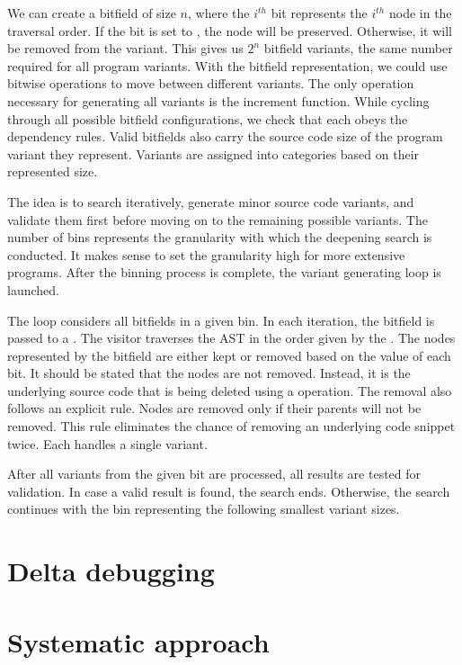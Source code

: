 We can create a bitfield of size $n$, where the $i^{th}$ bit represents 
the $i^{th}$ node in the traversal order.
If the bit is set to , the node will be preserved.
Otherwise, it will be removed from the variant.
This gives us $2^n$ bitfield variants, the same number required for all 
program variants.
With the bitfield representation, we could use bitwise operations to move 
between different variants.
The only operation necessary for generating all variants is the increment 
function.
While cycling through all possible bitfield configurations, we check that 
each obeys the dependency rules.
Valid bitfields also carry the source code size of the program variant they 
represent.
Variants are assigned into categories based on their represented size.

The idea is to search iteratively, generate minor source code variants, and 
validate them first before moving on to the remaining possible variants.
The number of bins represents the granularity with which the deepening 
search is conducted.
It makes sense to set the granularity high for more extensive programs.
After the binning process is complete, the variant generating loop is 
launched.

The loop considers all bitfields in a given bin.
In each iteration, the bitfield is passed to 
a .
The visitor traverses the AST in the order given by 
the .
The nodes represented by the bitfield are either kept or removed based on 
the value of each bit.
It should be stated that the nodes are not removed.
Instead, it is the underlying source code that is being deleted using 
a  operation.
The removal also follows an explicit rule.
Nodes are removed only if their parents will not be removed.
This rule eliminates the chance of removing an underlying code snippet twice.
Each  handles a single variant.

After all variants from the given bit are processed, all results are tested 
for validation.
In case a valid result is found, the search ends.
Otherwise, the search continues with the bin representing the following 
smallest variant sizes.

\section{Delta debugging}

\section{Systematic approach}

